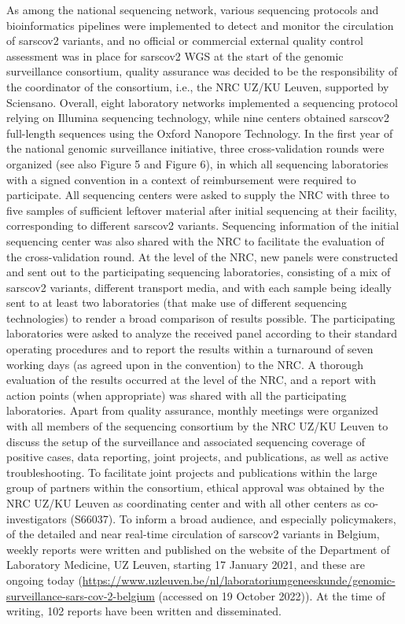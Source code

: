 As among the national sequencing network, various sequencing protocols and bioinformatics pipelines were implemented to detect and monitor the circulation of \gls{sarscov2} variants, and no official or commercial external quality control assessment was in place for \gls{sarscov2} WGS at the start of the genomic surveillance consortium, quality assurance was decided to be the responsibility of the coordinator of the consortium, i.e., the NRC UZ/KU Leuven, supported by Sciensano.
Overall, eight laboratory networks implemented a sequencing protocol relying on Illumina sequencing technology, while nine centers obtained \gls{sarscov2} full-length sequences using the Oxford Nanopore Technology.
In the first year of the national genomic surveillance initiative, three cross-validation rounds were organized (see also Figure 5 and Figure 6), in which all sequencing laboratories with a signed convention in a context of reimbursement were required to participate.
All sequencing centers were asked to supply the NRC with three to five samples of sufficient leftover material after initial sequencing at their facility, corresponding to different \gls{sarscov2} variants.
Sequencing information of the initial sequencing center was also shared with the NRC to facilitate the evaluation of the cross-validation round.
At the level of the NRC, new panels were constructed and sent out to the participating sequencing laboratories, consisting of a mix of \gls{sarscov2} variants, different transport media, and with each sample being ideally sent to at least two laboratories (that make use of different sequencing technologies) to render a broad comparison of results possible.
The participating laboratories were asked to analyze the received panel according to their standard operating procedures and to report the results within a turnaround of seven working days (as agreed upon in the convention) to the NRC.
A thorough evaluation of the results occurred at the level of the NRC, and a report with action points (when appropriate) was shared with all the participating laboratories.
Apart from quality assurance, monthly meetings were organized with all members of the sequencing consortium by the NRC UZ/KU Leuven to discuss the setup of the surveillance and associated sequencing coverage of positive cases, data reporting, joint projects, and publications, as well as active troubleshooting.
To facilitate joint projects and publications within the large group of partners within the consortium, ethical approval was obtained by the NRC UZ/KU Leuven as coordinating center and with all other centers as co-investigators (S66037).
To inform a broad audience, and especially policymakers, of the detailed and near real-time circulation of \gls{sarscov2} variants in Belgium, weekly reports were written and published on the website of the Department of Laboratory Medicine, UZ Leuven, starting 17 January 2021, and these are ongoing today (\url{https://www.uzleuven.be/nl/laboratoriumgeneeskunde/genomic-surveillance-sars-cov-2-belgium} (accessed on 19 October 2022)).
At the time of writing, 102 reports have been written and disseminated.


